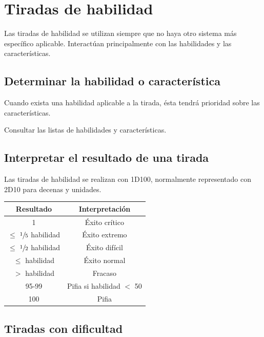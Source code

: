 \section{Tiradas de habilidad}

Las tiradas de habilidad se utilizan siempre que no haya otro sistema más específico aplicable. Interactúan principalmente con las habilidades y las características.

\subsection{Determinar la habilidad o característica}

Cuando exista una habilidad aplicable a la tirada, ésta tendrá prioridad sobre las características.

Consultar las listas de habilidades y características.

\subsection{Interpretar el resultado de una tirada}

Las tiradas de habilidad se realizan con 1D100, normalmente representado con 2D10 para decenas y unidades.

\vspace{-\parskip}

\begin{center}
\begin{tabular}{|c|c|}
    \hline
    Resultado                       & Interpretación            \\
    \hline
    1                               & Éxito crítico             \\
    $\leq$ $\sfrac{1}{5}$ habilidad & Éxito extremo             \\
    $\leq$ $\sfrac{1}{2}$ habilidad & Éxito difícil             \\
    $\leq$ habilidad                & Éxito normal              \\
    $>$ habilidad                   & Fracaso                   \\
    95-99                           & Pifia si habilidad $<$ 50 \\
    100                             & Pifia                     \\
    \hline
\end{tabular}
\end{center}

\subsection{Tiradas con dificultad}

